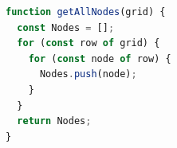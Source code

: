 \documentclass[12pt]{article}
\begin{document}
\begin{lstlisting}[language=JavaScript, caption=Kode for finde alle nodes i grid, label={lst:getAllNodes}]
function getAllNodes(grid) {
  const Nodes = [];
  for (const row of grid) {
    for (const node of row) {
      Nodes.push(node);
    }
  }
  return Nodes;
}
\end{lstlisting}

\end{document}
